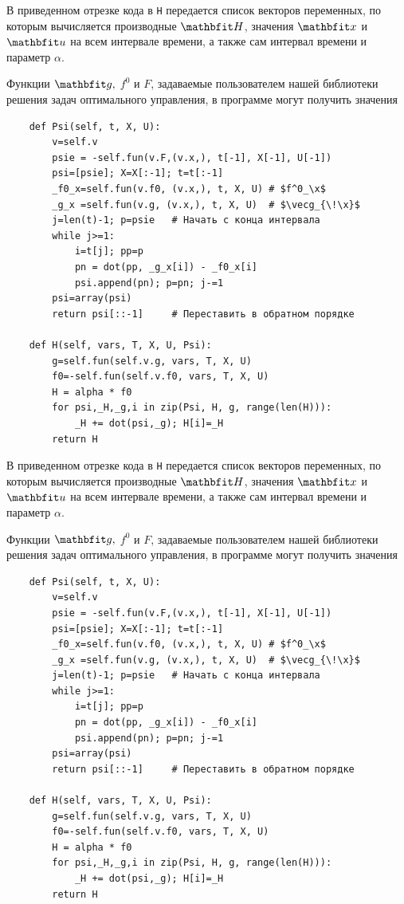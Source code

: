 \documentclass[a4paper,14pt, openany, twoside, draft]{extbook} %
\begin{document}
В приведенном отрезке кода в \texttt{H} передается список векторов переменных, по которым вычисляется производные $\vecH$, значения $\vecx$ и $\vecu$ на всем интервале времени, а также сам интервал времени и параметр $\alpha$.

Функции $\vecg,$ $f^0$ и $F$, задаваемые пользователем нашей библиотеки решения задач оптимального управления, в программе могут получить значения

\begin{verbatim}
    def Psi(self, t, X, U):
        v=self.v
        psie = -self.fun(v.F,(v.x,), t[-1], X[-1], U[-1])
        psi=[psie]; X=X[:-1]; t=t[:-1]
        _f0_x=self.fun(v.f0, (v.x,), t, X, U) # $f^0_\x$
        _g_x =self.fun(v.g, (v.x,), t, X, U)  # $\vecg_{\!\x}$
        j=len(t)-1; p=psie   # Начать с конца интервала
        while j>=1:
            i=t[j]; pp=p
            pn = dot(pp, _g_x[i]) - _f0_x[i]
            psi.append(pn); p=pn; j-=1
        psi=array(psi)
        return psi[::-1]     # Переставить в обратном порядке

    def H(self, vars, T, X, U, Psi):
        g=self.fun(self.v.g, vars, T, X, U)
        f0=-self.fun(self.v.f0, vars, T, X, U)
        H = alpha * f0
        for psi,_H,_g,i in zip(Psi, H, g, range(len(H))):
            _H += dot(psi,_g); H[i]=_H
        return H
\end{verbatim}

В приведенном отрезке кода в \texttt{H} передается список векторов переменных, по которым вычисляется производные $\vecH$, значения $\vecx$ и $\vecu$ на всем интервале времени, а также сам интервал времени и параметр $\alpha$.

Функции $\vecg,$ $f^0$ и $F$, задаваемые пользователем нашей библиотеки решения задач оптимального управления, в программе могут получить значения

\begin{verbatim}
    def Psi(self, t, X, U):
        v=self.v
        psie = -self.fun(v.F,(v.x,), t[-1], X[-1], U[-1])
        psi=[psie]; X=X[:-1]; t=t[:-1]
        _f0_x=self.fun(v.f0, (v.x,), t, X, U) # $f^0_\x$
        _g_x =self.fun(v.g, (v.x,), t, X, U)  # $\vecg_{\!\x}$
        j=len(t)-1; p=psie   # Начать с конца интервала
        while j>=1:
            i=t[j]; pp=p
            pn = dot(pp, _g_x[i]) - _f0_x[i]
            psi.append(pn); p=pn; j-=1
        psi=array(psi)
        return psi[::-1]     # Переставить в обратном порядке

    def H(self, vars, T, X, U, Psi):
        g=self.fun(self.v.g, vars, T, X, U)
        f0=-self.fun(self.v.f0, vars, T, X, U)
        H = alpha * f0
        for psi,_H,_g,i in zip(Psi, H, g, range(len(H))):
            _H += dot(psi,_g); H[i]=_H
        return H
\end{verbatim}
\end{document}
